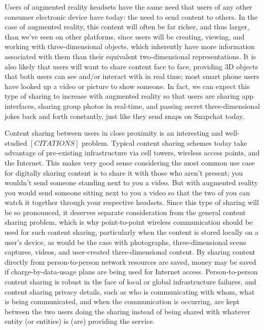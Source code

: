 \documentclass[12pt]{report}
\begin{document}
Users of augmented reality headsets have the same need that users of any other consumer electronic device have today: the need to send content to others. In the case of augmented reality, this content will often be far richer, and thus larger, than we've seen on other platforms, since users will be creating, viewing, and working with three-dimensional objects, which inherently have more information associated with them than their equivalent two-dimensional representations. It is also likely that users will want to share content face to face, providing 3D objects that both users can see and/or interact with in real time; most smart phone users have looked up a video or picture to show someone. In fact, we can expect this type of sharing to increase with augmented reality so that users are sharing app interfaces, sharing group photos in real-time, and passing secret three-dimensional jokes back and forth constantly, just like they send snaps on Snapchat today.

Content sharing between users in close proximity is an interesting and well-studied $[CITATIONS]$ problem. Typical content sharing schemes today take advantage of pre-existing infrastructure via cell towers, wireless access points, and the Internet. This makes very good sense considering the most common use case for digitally sharing content is to share it with those who aren't present; you wouldn't send someone standing next to you a video. But with augmented reality you would send someone sitting next to you a video so that the two of you can watch it together through your respective headsets. Since this type of sharing will be so pronounced, it deserves separate consideration from the general content sharing problem, which is why point-to-point wireless communication should be used for such content sharing, particularly when the content is stored locally on a user's device, as would be the case with photographs, three-dimensional scene captures, videos, and user-created three-dimensional content. By sharing content directly from person-to-person network resources are saved, money may be saved if charge-by-data-usage plans are being used for Internet access. Person-to-person content sharing is robust in the face of local or global infrastructure failures, and content sharing privacy details, such as who is communicating with whom, what is being communicated, and when the communication is occurring, are kept between the two users doing the sharing instead of being shared with whatever entity (or entities) is (are) providing the service. 
\end{document}
